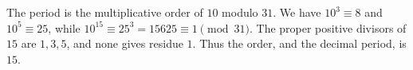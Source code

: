 The period is the multiplicative order of $10$ modulo $31$. We have $10^3\equiv8$ and $10^5\equiv25$, while $10^{15}\equiv25^3=15625\equiv1\pmod{31}$. The proper positive divisors of $15$ are $1,3,5$, and none gives residue $1$. Thus the order, and the decimal period, is $\boxed{15}$.
